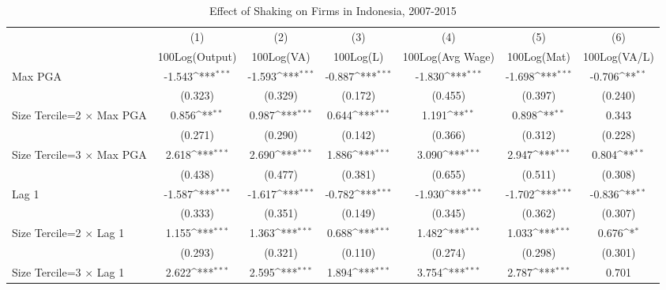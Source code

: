 \begin{table}[htbp]\centering
\def\sym#1{\ifmmode^{#1}\else\(^{#1}\)\fi}
\caption{Effect of Shaking on Firms in Indonesia, 2007-2015}
\begin{tabular}{l*{6}{c}}
\toprule
                &\multicolumn{1}{c}{(1)}&\multicolumn{1}{c}{(2)}&\multicolumn{1}{c}{(3)}&\multicolumn{1}{c}{(4)}&\multicolumn{1}{c}{(5)}&\multicolumn{1}{c}{(6)}\\
                &\multicolumn{1}{c}{100Log(Output)}&\multicolumn{1}{c}{100Log(VA)}&\multicolumn{1}{c}{100Log(L)}&\multicolumn{1}{c}{100Log(Avg Wage)}&\multicolumn{1}{c}{100Log(Mat)}&\multicolumn{1}{c}{100Log(VA/L)}\\
\midrule
Max PGA         &   -1.543\sym{***}&   -1.593\sym{***}&   -0.887\sym{***}&   -1.830\sym{***}&   -1.698\sym{***}&   -0.706\sym{**} \\
                &  (0.323)         &  (0.329)         &  (0.172)         &  (0.455)         &  (0.397)         &  (0.240)         \\
\addlinespace
Size Tercile=2 $\times$ Max PGA&    0.856\sym{**} &    0.987\sym{***}&    0.644\sym{***}&    1.191\sym{**} &    0.898\sym{**} &    0.343         \\
                &  (0.271)         &  (0.290)         &  (0.142)         &  (0.366)         &  (0.312)         &  (0.228)         \\
\addlinespace
Size Tercile=3 $\times$ Max PGA&    2.618\sym{***}&    2.690\sym{***}&    1.886\sym{***}&    3.090\sym{***}&    2.947\sym{***}&    0.804\sym{**} \\
                &  (0.438)         &  (0.477)         &  (0.381)         &  (0.655)         &  (0.511)         &  (0.308)         \\
\addlinespace
Lag 1           &   -1.587\sym{***}&   -1.617\sym{***}&   -0.782\sym{***}&   -1.930\sym{***}&   -1.702\sym{***}&   -0.836\sym{**} \\
                &  (0.333)         &  (0.351)         &  (0.149)         &  (0.345)         &  (0.362)         &  (0.307)         \\
\addlinespace
Size Tercile=2 $\times$ Lag 1&    1.155\sym{***}&    1.363\sym{***}&    0.688\sym{***}&    1.482\sym{***}&    1.033\sym{***}&    0.676\sym{*}  \\
                &  (0.293)         &  (0.321)         &  (0.110)         &  (0.274)         &  (0.298)         &  (0.301)         \\
\addlinespace
Size Tercile=3 $\times$ Lag 1&    2.622\sym{***}&    2.595\sym{***}&    1.894\sym{***}&    3.754\sym{***}&    2.787\sym{***}&    0.701         \\

\end{tabular}
\end{table}
